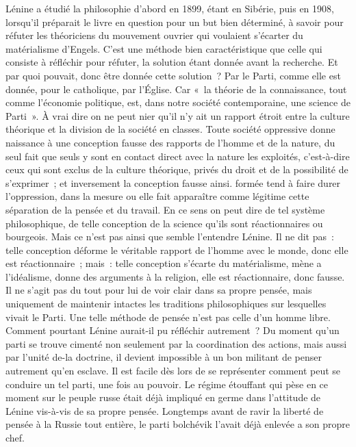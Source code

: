 \documentclass[french,twoside]{book} %
\begin{document}
Lénine a étudié la philosophie d'abord en 1899, étant en Sibérie, puis en 1908, lorsqu'il préparait le livre en question pour un but bien déterminé, à savoir pour réfuter les théoriciens du mouvement ouvrier qui voulaient s'écarter du matérialisme d’Engels. C'est une méthode bien caractéristique que celle qui consiste à réfléchir pour réfuter, la solution étant donnée avant la recherche. Et par quoi pouvait, donc être donnée cette solution ? Par le Parti, comme elle est donnée, pour le catholique, par l'Église. Car « la théorie de la connaissance, tout comme l'économie politique, est, dans notre société contemporaine, une science de Parti ». À vrai dire on ne peut nier qu'il n'y ait un rapport étroit entre la culture théorique et la division de la société en classes. Toute société oppressive donne naissance à une conception fausse des rapports de l'homme et de la nature, du seul fait que seuls y sont en contact direct avec la nature les exploités, c'est-à-dire ceux qui sont exclus de la culture théorique, privés du droit et de la possibilité de s'exprimer ; et inversement la conception fausse ainsi. formée tend à faire durer l'oppression, dans la mesure ou elle fait apparaître comme légitime cette séparation de la pensée et du travail. En ce sens on peut dire de tel système philosophique, de telle conception de la science qu'ils sont réactionnaires ou bourgeois. Mais ce n'est pas ainsi que semble l'entendre Lénine. Il ne dit pas : telle conception déforme le véritable rapport de l'homme avec le monde, donc elle est réactionnaire ; mais : telle conception s'écarte du matérialisme, mène a l'idéalisme, donne des arguments à la religion, elle est réactionnaire, donc fausse. Il ne s'agit pas du tout pour lui de voir clair dans sa propre pensée, mais uniquement de maintenir intactes les traditions philosophiques sur lesquelles vivait le Parti. Une telle méthode de pensée n'est pas celle d'un homme libre. Comment pourtant Lénine aurait-il pu réfléchir autrement ? Du moment qu'un parti se trouve cimenté non seulement par la coordination des actions, mais aussi par l'unité de-la doctrine, il devient impossible à un bon militant de penser autrement qu'en esclave. Il est facile dès lors de se représenter comment peut se conduire un tel parti, une fois au pouvoir. Le régime étouffant qui pèse en ce moment sur le peuple russe était déjà impliqué en germe dans l'attitude de Lénine vis-à-vis de sa propre pensée. Longtemps avant de ravir la liberté de pensée à la Russie tout entière, le parti bolchévik l'avait déjà enlevée a son propre chef.\par
\end{document}
